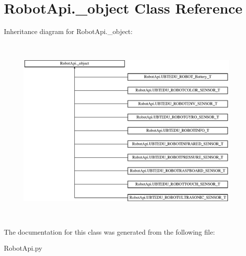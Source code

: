 \hypertarget{classRobotApi_1_1__object}{\section{Robot\+Api.\+\_\+object Class Reference}
\label{classRobotApi_1_1__object}
}
Inheritance diagram for Robot\+Api.\+\_\+object\+:\begin{figure}[H]
\begin{center}
\leavevmode
\includegraphics[height=9.535604cm]{classRobotApi_1_1__object}
\end{center}
\end{figure}


The documentation for this class was generated from the following file\+:\begin{DoxyCompactItemize}
\item 
Robot\+Api.\+py\end{DoxyCompactItemize}
